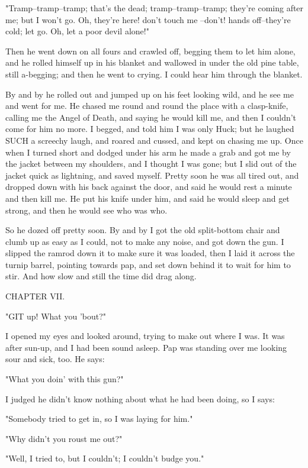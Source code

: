 "Tramp--tramp--tramp; that's the dead; tramp--tramp--tramp; they're
coming after me; but I won't go.  Oh, they're here! don't touch me
--don't! hands off--they're cold; let go.  Oh, let a poor devil alone!"

Then he went down on all fours and crawled off, begging them to let him
alone, and he rolled himself up in his blanket and wallowed in under the
old pine table, still a-begging; and then he went to crying.  I could
hear him through the blanket.

By and by he rolled out and jumped up on his feet looking wild, and he
see me and went for me.  He chased me round and round the place with a
clasp-knife, calling me the Angel of Death, and saying he would kill me,
and then I couldn't come for him no more.  I begged, and told him I was
only Huck; but he laughed SUCH a screechy laugh, and roared and cussed,
and kept on chasing me up.  Once when I turned short and dodged under his
arm he made a grab and got me by the jacket between my shoulders, and I
thought I was gone; but I slid out of the jacket quick as lightning, and
saved myself. Pretty soon he was all tired out, and dropped down with his
back against the door, and said he would rest a minute and then kill me.
He put his knife under him, and said he would sleep and get strong, and
then he would see who was who.

So he dozed off pretty soon.  By and by I got the old split-bottom chair
and clumb up as easy as I could, not to make any noise, and got down the
gun.  I slipped the ramrod down it to make sure it was loaded, then I
laid it across the turnip barrel, pointing towards pap, and set down
behind it to wait for him to stir.  And how slow and still the time did
drag along.




CHAPTER VII.

"GIT up!  What you 'bout?"

I opened my eyes and looked around, trying to make out where I was.  It
was after sun-up, and I had been sound asleep.  Pap was standing over me
looking sour and sick, too.  He says:

"What you doin' with this gun?"

I judged he didn't know nothing about what he had been doing, so I says:

"Somebody tried to get in, so I was laying for him."

"Why didn't you roust me out?"

"Well, I tried to, but I couldn't; I couldn't budge you."

